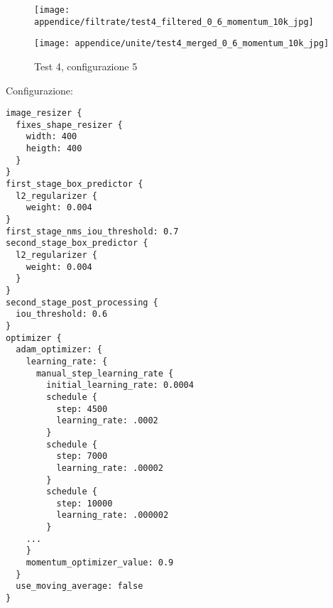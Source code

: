 \newpage
\begin{figure}[H]  
    \begin{minipage}{.5\columnwidth}  
        \centering  
        \texttt{[image: appendice/filtrate/test4\_filtered\_0\_6\_momentum\_10k\_jpg]}  
    \end{minipage}%
    \begin{minipage}{0.5\columnwidth}  
        \centering  
        \texttt{[image: appendice/unite/test4\_merged\_0\_6\_momentum\_10k\_jpg]}  
    \end{minipage}  
    \caption{Test 4, configurazione 5}
\end{figure}%
Configurazione:
\begin{multicols}{2}
    \begin{lstlisting}
image_resizer {
  fixes_shape_resizer {
    width: 400
    heigth: 400
  }
}
first_stage_box_predictor {
  l2_regularizer {
    weight: 0.004
}
first_stage_nms_iou_threshold: 0.7
second_stage_box_predictor {
  l2_regularizer {
    weight: 0.004
  }
}
second_stage_post_processing {
  iou_threshold: 0.6
}
optimizer {
  adam_optimizer: {
    learning_rate: {
      manual_step_learning_rate {
        initial_learning_rate: 0.0004
        schedule {
          step: 4500
          learning_rate: .0002
        }
        schedule {
          step: 7000
          learning_rate: .00002
        }
        schedule {
          step: 10000
          learning_rate: .000002
        }
    ...
    }
    momentum_optimizer_value: 0.9
  }
  use_moving_average: false
}
    \end{lstlisting}
\end{multicols}

